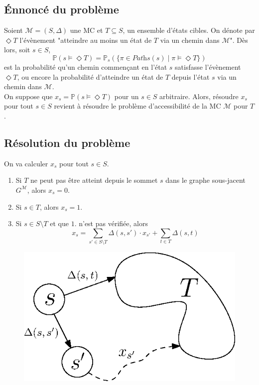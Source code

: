 \documentclass[12pt,a4paper]{report}
\theoremstyle{definition}%
\theoremstyle{remark}
\begin{document}
\subsection{\'Ennoncé du problème}
Soient $\mathcal{M} = (S, \Delta)$ une MC et $T \subseteq S$, un ensemble d'états cibles. On dénote par $\Diamond T$ l'évènement "atteindre au moins un état de $T$ via un chemin dans $\mathcal{M}$". Dès lors, soit $s \in S$, \[\mathbb{P}(s \models \Diamond T) = \mathbb{P}_s(\{\pi \in \textit{Paths}(s) \; | \; \pi \models \Diamond T\})\] est la probabilité qu'un chemin commençant en l'état $s$ satisfasse l'évènement $\Diamond T$, ou encore la probabilité d'atteindre un état de $T$ depuis l'état $s$ via un chemin dans $\mathcal{M}$.\\
On suppose que $x_s = \mathbb{P}(s \models \Diamond T)$ pour un $s \in S$ arbitraire. Alors, résoudre $x_s$ pour tout $s\in S$ revient à résoudre le problème d'accessibilité de la MC $\mathcal{M}$ pour $T$.

\subsection{Résolution du problème}
On va calculer $x_s$  pour tout $s \in S$.
\begin{enumerate}
	\item Si $T$ ne peut pas être atteint depuis le sommet $s$ dans le graphe sous-jacent $G^\mathcal{M}$, alors $x_s = 0$.
	\item Si $s \in T$, alors $x_s = 1$.
	\item Si $s \in S \setminus T$ et que $1.$ n'est pas vérifiée, alors 
		\[ x_s = \sum_{s' \in S \setminus T} \Delta(s, s') \cdot x_{s'} + \sum_{t \in T} \Delta(s, t) \]
\end{enumerate}

\begin{figure}[H]
	\centering
	\includegraphics[scale=0.6]{figures/reachability.eps}
	\label{reachablity}
\end{figure}
\end{document}
